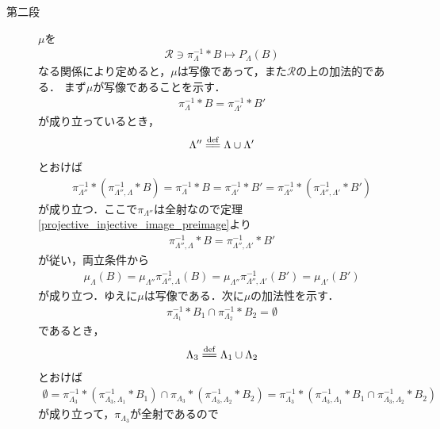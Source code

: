 \begin{prf}
\begin{description}
			\item[第二段]
				$\mu$を
				\begin{align}
					\mathscr{R} \ni \pi_\Lambda^{-1} \ast B \longmapsto P_\Lambda(B)
				\end{align}
				なる関係により定めると，$\mu$は写像であって，また$\mathscr{R}$の上の加法的である．
				まず$\mu$が写像であることを示す．
				\begin{align}
					\pi_\Lambda^{-1} \ast B = \pi_{\Lambda'}^{-1} \ast B'
				\end{align}
				が成り立っているとき，
				\begin{align}
					\Lambda'' \defeq \Lambda \cup \Lambda'
				\end{align}
				とおけば
				\begin{align}
					\pi_{\Lambda''}^{-1} \ast \left( \pi_{\Lambda'',\Lambda}^{-1} \ast B \right)
					= \pi_\Lambda^{-1} \ast B
					= \pi_{\Lambda'}^{-1} \ast B'
					= \pi_{\Lambda''}^{-1} \ast \left( \pi_{\Lambda'',\Lambda'}^{-1} \ast B' \right)
				\end{align}
				が成り立つ．ここで$\pi_{\Lambda''}$は全射なので定理\ref{projective_injective_image_preimage}より
				\begin{align}
					\pi_{\Lambda'',\Lambda}^{-1} \ast B = \pi_{\Lambda'',\Lambda'}^{-1} \ast B'
				\end{align}
				が従い，両立条件から
				\begin{align}
					\mu_\Lambda(B) 
					= \mu_{\Lambda''} \pi_{\Lambda'',\Lambda}^{-1}(B)
					= \mu_{\Lambda''} \pi_{\Lambda'',\Lambda'}^{-1}(B')
					= \mu_{\Lambda'}(B')
				\end{align}
				が成り立つ．ゆえに$\mu$は写像である．次に$\mu$の加法性を示す．
				\begin{align}
					\pi_{\Lambda_1}^{-1} \ast B_1 \cap \pi_{\Lambda_2}^{-1} \ast B_2 = \emptyset
				\end{align}
				であるとき，
				\begin{align}
					\Lambda_3 \defeq \Lambda_1 \cup \Lambda_2
				\end{align}
				とおけば
				\begin{align}
					\emptyset 
					= \pi_{\Lambda_3}^{-1} \ast \left( \pi_{\Lambda_3,\Lambda_1}^{-1} \ast B_1 \right)
					\cap \pi_{\Lambda_3} \ast \left( \pi_{\Lambda_3,\Lambda_2}^{-1} \ast B_2 \right)
					= \pi_{\Lambda_3}^{-1} \ast \left( \pi_{\Lambda_3,\Lambda_1}^{-1} \ast B_1 \cap \pi_{\Lambda_3,\Lambda_2}^{-1} \ast B_2 \right)
				\end{align}
				が成り立って，$\pi_{\Lambda_3}$が全射であるので

\end{description}
\end{prf}
